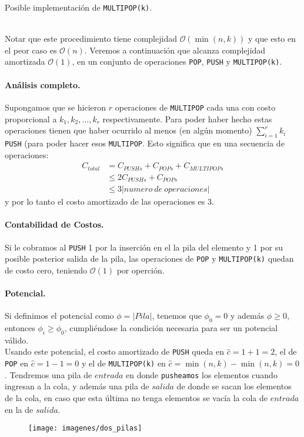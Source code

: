 \documentclass[dcc,uchile]{fcfmcourse}
\theoremstyle{plain}
\theoremstyle{definition}
\begin{document}
\begin{problems}
\problem Posible implementación de \texttt{MULTIPOP(k)}.
\begin{algorithm}
\end{algorithm}
\\Notar que este procedimiento tiene complejidad $\mathcal{O}(\min(n,k))$ y que esto en el peor caso es  $\mathcal{O}(n)$. Veremos a continuación que alcanza complejidad amortizada $\mathcal{O}(1)$, en un conjunto de operaciones \texttt{POP}, \texttt{PUSH} y \texttt{MULTIPOP(k)}.
\paragraph{Análisis completo.} Supongamos que se hicieron $r$ operaciones de \texttt{MULTIPOP} cada una con costo proporcional a $k_{1}, k_{2}, \ldots, k_{r}$ respectivamente. Para poder haber hecho estas operaciones tienen que haber ocurrido al menos (en algún momento) $\sum_{i=1}^r k_{i}$ \texttt{PUSH} (para poder hacer esos \texttt{MULTIPOP}. Esto significa que en una secuencia de operaciones:
\begin{align*}
    C_{total} &= C_{PUSHs} + C_{POPs} + C_{MULTIPOPs} \\
    &\le 2C_{PUSHs} + C_{POPs}\\
    &\le 3|numero\ de\ operaciones|
\end{align*}
y por lo tanto el costo amortizado de las operaciones es $3$.

\paragraph{Contabilidad de Costos.} Si le cobramos al \texttt{PUSH} 1 por la inserción en el la pila del elemento y 1 por su posible posterior salida de la pila, las operaciones de \texttt{POP} y \texttt{MULTIPOP(k)} quedan de costo cero, teniendo $\mathcal{O}(1)$ por operción.

\paragraph{Potencial.}
Si definimos el potencial como $\phi = |Pila|$, tenemos que $\phi_0 = 0$ y además $\phi \ge 0$, entonces $\phi_i\ge \phi_0$, cumpliéndose la condición necesaria para ser un potencial válido.\\
Usando este potencial, el costo amortizado de \texttt{PUSH} queda en $\hat{c} = 1 + 1 = 2$, el de \texttt{POP} en $\hat{c} = 1 - 1 = 0$ y el de \texttt{MULTIPOP(k)} en $\hat{c} = \min(n,k) - \min(n,k) = 0$.
\problem Tendremos una pila de $entrada$ en donde \texttt{pusheamos} los elementos cuando ingresan a la cola, y además una pila de $salida$ de donde se sacan los elementos de la cola, en caso que esta última no tenga elementos se vacía la cola de $entrada$ en la de $salida$.
\begin{figure}[h]
    \centering
    \texttt{[image: imagenes/dos\_pilas]}
\end{figure}


\end{problems}
\end{document}
